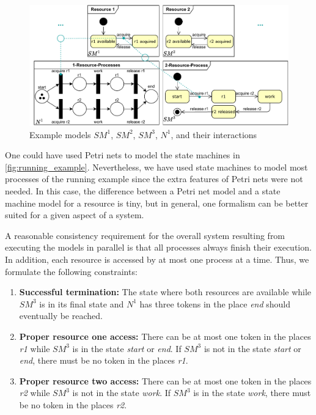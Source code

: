 \documentclass[conference]{IEEEtran}
\begin{document}
\begin{figure}[h]
    \centering
    \includegraphics[width=5in]{example}
    \caption{Example models $SM^1$, $SM^2$, $SM^3$, $N^1$, and their interactions}
    \label{fig:running_example}
\end{figure}

One could have used Petri nets to model the state machines in \autoref{fig:running_example}.
Nevertheless, we have used state machines to model most processes of the running example since the extra features of Petri nets were not needed.
In this case, the difference between a Petri net model and a state machine model for a resource is tiny, but in general, one formalism can be better suited for a given aspect of a system.

A reasonable consistency requirement for the overall system resulting from executing the models in parallel is that all processes always finish their execution.
In addition, each resource is accessed by at most one process at a time.
Thus, we formulate the following constraints:
\begin{enumerate}
    \item \textbf{Successful termination:} The state where both resources are available while $SM^3$ is in its final state and $N^1$ has three tokens in the place \textit{end} should eventually be reached.
    \item \textbf{Proper resource one access:} There can be at most one token in the places \textit{r1} while $SM^3$ is in the state \textit{start} or \textit{end}.
    If $SM^3$ is not in the state \textit{start} or \textit{end}, there must be no token in the places \textit{r1}.
    \item \textbf{Proper resource two access:} There can be at most one token in the places \textit{r2} while $SM^3$ is not in the state \textit{work}.
    If $SM^3$ is in the state \textit{work}, there must be no token in the places \textit{r2}.
\end{enumerate}
\end{document}
